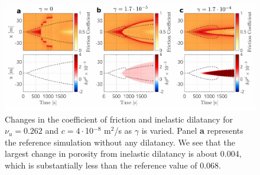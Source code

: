 \documentclass[draft]{agujournal2019}
\begin{document}
\begin{figure}[H]
\centering
\includegraphics[scale =  0.95]{Figures/gammasmall_comparison_variation.pdf} %
\caption{Changes in the coefficient of friction and inelastic dilatancy for $\nu_u = 0.262$ and $c = 4\cdot$10$^{-8}$ m$^2$/s as $\gamma$ is varied. Panel {\bf a} represents the reference simulation without any dilatancy. We see that the largest change in porosity from inelastic dilatancy is about 0.004, which is substantially less than the reference value of 0.068.}
\label{fig:fandphi}
\end{figure}


\end{document}
